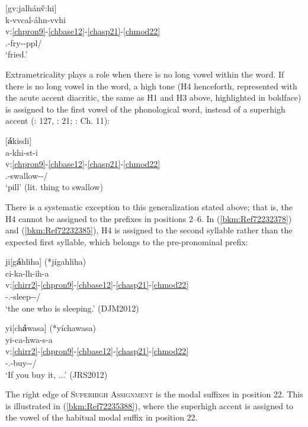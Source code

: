 \documentclass[output=paper]{langscibook}
\begin{document}
\ea\label{bkm:Ref72232270}[gv:jalhán\H{v}:hi] \\
\glll k-vvcal-áhn-vvhi\\
v:\ref{chpron9}-\ref{chbase12}-\ref{chasp21}-\ref{chmod22}\\ 
\Third\Sg.\Aarg{}-fry-\Prf{}-ppl/\Sh{}\\ 
\glt `fried.' \citep[127]{Feeling1975}
\z 

Extrametricality plays a role when there is no long vowel within the word. If there is no long vowel in the word, a high tone (H4 henceforth, represented with the acute accent diacritic, the same as H1 and H3 above, highlighted in boldface) is assigned to the first vowel of the phonological word, instead of a superhigh accent (\citealt{Lindsey1985}: 127, \citealt{Wright1996}: 21; \citealt{uchihara2016tone}: Ch. 11):

\ea\label{ex:cher:key:25} [\textbf{á}kisdi]\\
\glll a-khi-st-i\\
v:\ref{chpron9}-\ref{chbase12}-\ref{chasp21}-\ref{chmod22}\\
\Third\Sg.\Aarg{}-swallow-\Inf-\Nom/\Sh{}\\
\glt `pill' (lit. thing to swallow) \citep[33]{Feeling1975}
\z 

There is a systematic exception to this generalization stated above; that is, the H4 cannot be assigned to the prefixes in positions 2--6. In (\ref{bkm:Ref72232378}) and (\ref{bkm:Ref72232385}), H4 is assigned to the second syllable rather than the expected first syllable, which belongs to the pre-pronominal prefix:

\ea\label{bkm:Ref72232378}ji[g\textbf{á}hliha] (*jígahliha) \\
\glll ci-ka-lh-ih-a\\
v:\ref{chirr2}-\ref{chpron9}-\ref{chbase12}-\ref{chasp21}-\ref{chmod22}\\
\Rel{}-\Third\Sg.\Aarg{}-sleep-\Prs{}-\Ind{}/\Sh{}\\ 
\glt `the one who is sleeping.' (DJM2012)
\z 

\ea\label{bkm:Ref72232385}yi[ch\textbf{á}wasa] (*yíchawasa) \\
\glll yi-ca-hwa-s-a\\
v:\ref{chirr2}-\ref{chpron9}-\ref{chbase12}-\ref{chasp21}-\ref{chmod22}\\
\Irr{}-\Second\Sg.\Barg{}-buy-\Prf{}-\Ind{}/\Sh{}\\
\glt `If you buy it, ...' (JRS2012)
\z 

The right edge of \textsc{Superhigh} \textsc{Assignment} is the modal suffixes in position 22. This is illustrated in (\ref{bkm:Ref72235388}), where the superhigh accent is assigned to the vowel of the habitual modal suffix in position 22. 
\end{document}
